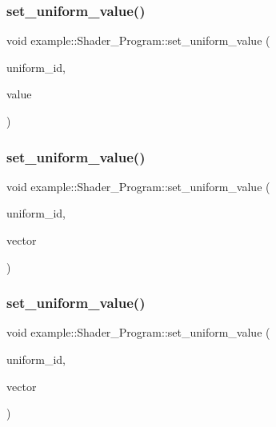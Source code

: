 \subsubsection{set\_uniform\_value()\hspace{0.1cm}{\footnotesize\ttfamily [2/8]}}
{\footnotesize\ttfamily void example\+::\+Shader\+\_\+\+Program\+::set\+\_\+uniform\+\_\+value (\begin{DoxyParamCaption}\item[{G\+Lint}]{uniform\+\_\+id,  }\item[{const float \&}]{value }\end{DoxyParamCaption})\hspace{0.3cm}{\ttfamily [inline]}}

\mbox{\label{classexample_1_1_shader___program_a91b8b17fda08bc9f1b6c94bfe8c4f8d3}} 
\subsubsection{set\_uniform\_value()\hspace{0.1cm}{\footnotesize\ttfamily [3/8]}}
{\footnotesize\ttfamily void example\+::\+Shader\+\_\+\+Program\+::set\+\_\+uniform\+\_\+value (\begin{DoxyParamCaption}\item[{G\+Lint}]{uniform\+\_\+id,  }\item[{const Vector2f \&}]{vector }\end{DoxyParamCaption})\hspace{0.3cm}{\ttfamily [inline]}}

\mbox{\label{classexample_1_1_shader___program_a4cf2fdc503438ec1d4d97aa6cd3c2ee7}} 
\subsubsection{set\_uniform\_value()\hspace{0.1cm}{\footnotesize\ttfamily [4/8]}}
{\footnotesize\ttfamily void example\+::\+Shader\+\_\+\+Program\+::set\+\_\+uniform\+\_\+value (\begin{DoxyParamCaption}\item[{G\+Lint}]{uniform\+\_\+id,  }\item[{const Vector3f \&}]{vector }\end{DoxyParamCaption})\hspace{0.3cm}{\ttfamily [inline]}}

